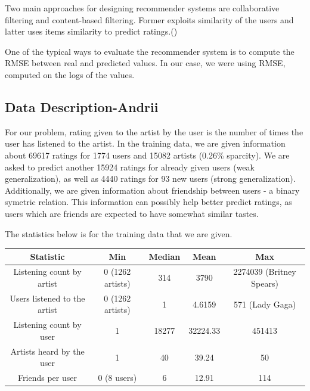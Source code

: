 \documentclass{article} %
\begin{document}
Two main approaches for designing recommender systems are collaborative
filtering and content-based filtering. Former exploits similarity of the users
and latter uses items similarity to predict
ratings.(\citep{ricci2011introduction})

One of the typical ways to evaluate the recommender system is to compute the
RMSE between real and predicted values. In our case, we were using RMSE,
computed on the logs of the values.
\subsection{Data Description-Andrii}

For our problem, rating given to the artist by the user is the number of times
the user has listened to the artist. In the training data, we are given
information about 69617 ratings for 1774 users and 15082 artists (0.26\%
sparcity). We are asked to predict another 15924 ratings for already given users (weak generalization), as
well as 4440 ratings for 93 new users (strong generalization). Additionally, we
are given information about friendship between users - a binary symetric
relation. This information can possibly help better predict ratings,
as users which are friends are expected to have somewhat similar tastes.

The statistics below is for the training data that we are given.

\begin{tabular}{| c | c | c | c | c | }
\hline
Statistic 				     & Min              & Median & Mean     & Max \\ \hline
Listening count by artist    & 0 (1262 artists) & 314    & 3790     & 2274039
(Britney Spears) \\ \hline
Users listened to the artist & 0 (1262 artists) & 1      & 4.6159   & 571 (Lady
Gaga) \\ \hline
Listening count by user      & 1                & 18277  & 32224.33 & 451413 \\
\hline
Artists heard by the user    & 1                & 40     & 39.24    & 50 \\
\hline
Friends per user             & 0 (8 users)      & 6      & 12.91    & 114 \\
\hline
\end{tabular}

\end{document}
